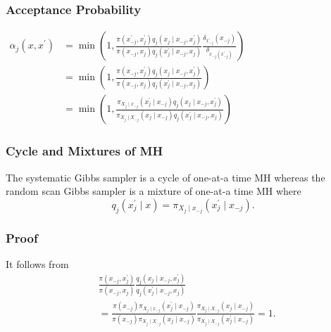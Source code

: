 \documentclass{article}
\begin{document}
\subsubsection{Acceptance Probability}
$\begin{aligned} \alpha_j\left(x, x^{\prime}\right) & =\min \left(1, \frac{\pi\left(x_{-j}^{\prime}, x_j^{\prime}\right) q_j\left(x_j \mid x_{-j}, x_j^{\prime}\right)}{\pi\left(x_{-j}, x_j\right) q_j\left(x_j^{\prime} \mid x_{-j}, x_j\right)} \frac{\delta_{x_{-j}^{\prime}}\left(x_{-j}\right)}{\delta_{x_{-j}\left(x_{-j}^{\prime}\right)}}\right) \\ & =\min \left(1, \frac{\pi\left(x_{-j}, x_j^{\prime}\right) q_j\left(x_j \mid x_{-j}, x_j^{\prime}\right)}{\pi\left(x_{-j}, x_j\right) q_j\left(x_j^{\prime} \mid x_{-j}, x_j\right)}\right) \\ & =\min \left(1, \frac{\pi_{X_j \mid x_{-j}}\left(x_j^{\prime} \mid x_{-j}\right) q_j\left(x_j \mid x_{-j}, x_j^{\prime}\right)}{\pi_{X_j \mid X_{-j}}\left(x_j \mid x_{-j}\right) q_j\left(x_j^{\prime} \mid x_{-j}, x_j\right)}\right)\end{aligned}$


\subsubsection{Cycle and Mixtures of MH}
The systematic Gibbs sampler is a cycle of one-at-a time MH whereas the random scan Gibbs sampler is a mixture of one-at-a time MH where
$$
q_j\left(x_j^{\prime} \mid x\right)=\pi_{X_j \mid x_{-j}}\left(x_j^{\prime} \mid x_{-j}\right) .
$$

\subsubsection{Proof}
It follows from
$$
\begin{aligned}
& \frac{\pi\left(x_{-j}, x_j^{\prime}\right)}{\pi\left(x_{-j}, x_j\right)} \frac{q_j\left(x_j \mid x_{-j}, x_j^{\prime}\right)}{q_j\left(x_j^{\prime} \mid x_{-j}, x_j\right)} \\
& =\frac{\pi\left(x_{-j}\right) \pi_{X_j \mid x_{-j}}\left(x_j^{\prime} \mid x_{-j}\right)}{\pi\left(x_{-j}\right) \pi_{X_j \mid X_{-j}}\left(x_j \mid x_{-j}\right)} \frac{\pi_{X_j \mid X_{-j}}\left(x_j \mid x_{-j}\right)}{\pi_{X_j \mid X_{-j}}\left(x_j^{\prime} \mid x_{-j}\right)}=1 .
\end{aligned}
$$
\end{document}
